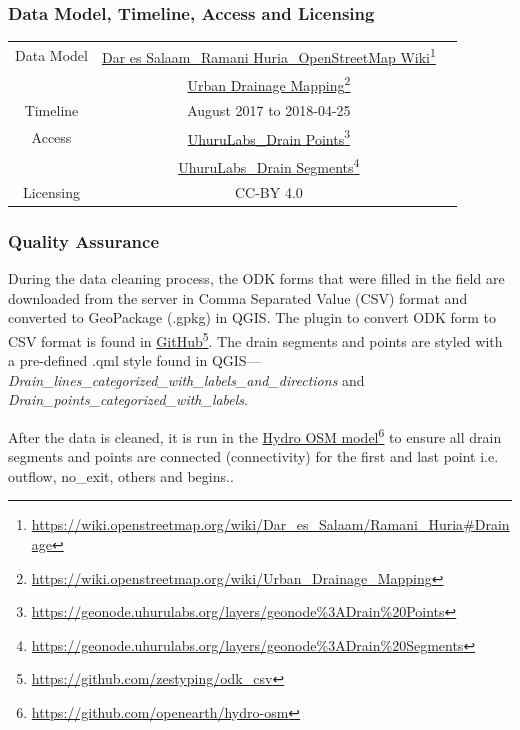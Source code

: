 \documentclass[a4paper,12pt,twoside]{article}
\begin{document}
\subsubsection{Data Model, Timeline, Access and Licensing}
\begin{center}
  \begin{tabular}{|c|c|c|}  
 \hline
    Data Model    &   \href{https://wiki.openstreetmap.org/wiki/Dar_es_Salaam/Ramani_Huria\#Drainage}{Dar es Salaam\_Ramani Huria\_OpenStreetMap Wiki}\footnote{\url{https://wiki.openstreetmap.org/wiki/Dar_es_Salaam/Ramani_Huria\#Drainage}}\\
    {} & \href{https://wiki.openstreetmap.org/wiki/Urban_Drainage_Mapping}{Urban Drainage Mapping}\footnote{\url{https://wiki.openstreetmap.org/wiki/Urban_Drainage_Mapping}}\\
\hline
   Timeline  & August 2017 to 2018-04-25 \\
\hline 
Access & {\href{https://geonode.uhurulabs.org/layers/geonode\%3ADrain\%20Points}{UhuruLabs\_Drain Points}\footnote{\url{https://geonode.uhurulabs.org/layers/geonode\%3ADrain\%20Points}}}\\
{} & {\href{https://geonode.uhurulabs.org/layers/geonode\%3ADrain\%20Segments}{UhuruLabs\_Drain Segments}\footnote{\url{https://geonode.uhurulabs.org/layers/geonode\%3ADrain\%20Segments}}} \\ 
 \hline      
  Licensing & CC-BY 4.0 \\
 \hline
\end{tabular}
\end{center}

\subsubsection{Quality Assurance}
During the data cleaning process, the ODK forms that were filled in the field are downloaded from the server in Comma Separated Value (CSV) format and converted to GeoPackage (.gpkg) in QGIS. The plugin to convert ODK form to CSV format is found in \href{https://github.com/zestyping/odk_csv}{GitHub}\footnote{\url{https://github.com/zestyping/odk\_csv}}. The drain segments and points are styled with a pre-defined .qml style found in QGIS---\textit{Drain\_lines\_categorized\_with\_labels\_and\_directions} and \textit{Drain\_points\_categorized\_with\_labels}.

\medskip

After the data is cleaned, it is run in the \href{https://github.com/openearth/hydro-osm}{Hydro OSM model}\footnote{\url{https://github.com/openearth/hydro-osm}} to ensure all drain segments and points are connected  (connectivity) for the first and last point i.e. outflow, no\_exit, others and begins..
\end{document}
